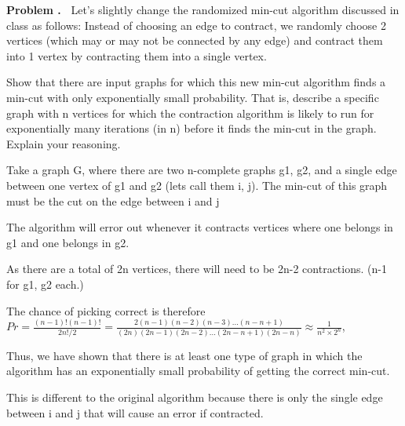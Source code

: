 \documentclass{article}
\newcommand{\addbigskip}{\addvspace{2\bigskipamount}}
\newcommand{\nline}{\bigskip}
\newcounter{problemnum}
\newenvironment{problem}
  {\addbigskip \setcounter{partnum}{0}
   \noindent\stepcounter{problemnum}\textbf{Problem \arabic{problemnum}.\ }}
  {\par\addbigskip}
\newcounter{partnum}
\newenvironment{answer}
{\begin{lrbox}{\mybox}\begin{minipage}{0.95\textwidth}\vspace{0.2cm}}
  {\vspace{0.1cm}\end{minipage}\end{lrbox}\fbox{\usebox{\mybox}}}
\begin{document}
\newpage

\begin{problem}
    Let's slightly change the randomized min-cut algorithm discussed in class as follows: Instead of choosing an edge to contract, we randomly choose 2 vertices (which may or may not be connected by any edge) and contract them into 1 vertex by contracting them into a single vertex.

    Show that there are input graphs for which this new min-cut algorithm finds a min-cut with only exponentially small probability. That is, describe a specific graph with n vertices for which the contraction algorithm is likely to run for exponentially many iterations (in n) before it finds the min-cut in the graph. Explain your reasoning.
\end{problem}

\begin{answer}
    Take a graph G, where there are two n-complete graphs g1, g2, and a single edge between one vertex of g1 and g2 (lets call them i, j). The min-cut of this graph must be the cut on the edge between i and j

    \nline

    The algorithm will error out whenever it contracts vertices where one belongs in g1 and one belongs in g2.

    \nline

    As there are  a total of 2n vertices, there will need to be 2n-2 contractions. (n-1 for g1, g2 each.)

    \nline

    The chance of picking correct is therefore $Pr = \frac{(n-1)!(n-1)!}{2n!/2} = \frac{2 (n-1)(n-2)(n-3)...(n-n+1)}{(2n)(2n-1)(2n-2)...(2n-n+1)(2n-n)} \approx \frac{1}{n^2 \times 2^n}$, 

    \nline

    Thus, we have shown that there is at least one type of graph in which the algorithm has an exponentially small probability of getting the correct min-cut.

    \nline

    This is different to the original algorithm because there is only the single edge between i and j that will cause an error if contracted.
\end{answer}
\end{document}
